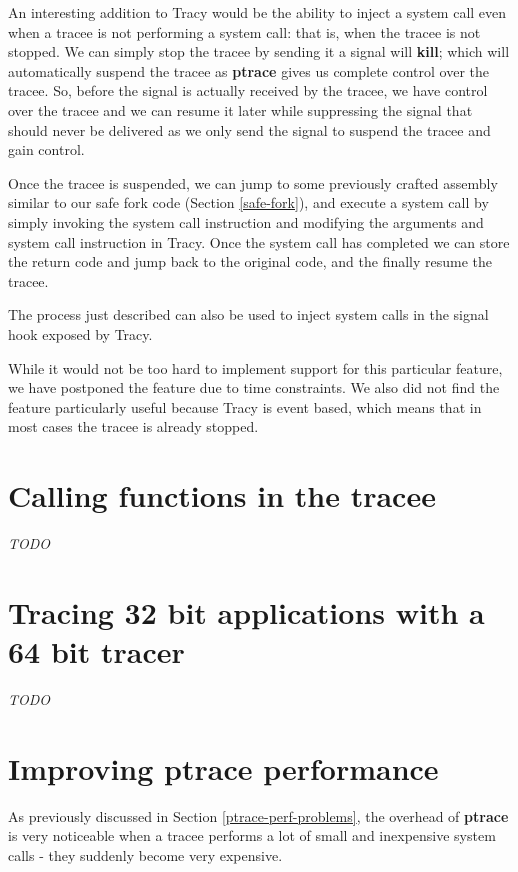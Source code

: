 \documentclass[a4paper, 10pt]{report}
\begin{document}
An interesting addition to Tracy would be the ability to inject a system call
even when a tracee is not performing a system call: that is, when the tracee
is not stopped. We can simply stop the tracee by sending it a signal will
\textbf{kill}; which will automatically suspend the tracee as
\textbf{ptrace} gives us complete control over the tracee.
So, before the signal is actually received by the tracee, we have control
over the tracee and we can resume it later while suppressing the signal that
should never be delivered as we only send the signal to suspend the tracee and
gain control.

Once the tracee is suspended, we can jump to some previously crafted assembly
similar to our safe fork code (Section \ref{safe-fork}), and execute a system
call by simply invoking the system call instruction and modifying the
arguments and system call instruction in Tracy. Once the system call
has completed we can store the return code and jump back to the original code,
and the finally resume the tracee.

The process just described can also be used to inject system calls
in the signal hook exposed by Tracy.

While it would not be too hard to implement support for this particular
feature, we have postponed the feature due to time constraints. We also
did not find the feature particularly useful because Tracy is event based,
which means that in most cases the tracee is already stopped.

\section{Calling functions in the tracee}
\textit{TODO}

\section{Tracing 32 bit applications with a 64 bit tracer}
\textit{TODO}

\section{Improving ptrace performance}
\label{ptrace-perf}

As previously discussed in Section \ref{ptrace-perf-problems}, the overhead
of \textbf{ptrace} is very noticeable when a tracee performs a lot of
small and inexpensive system calls - they suddenly become very expensive.
\end{document}
